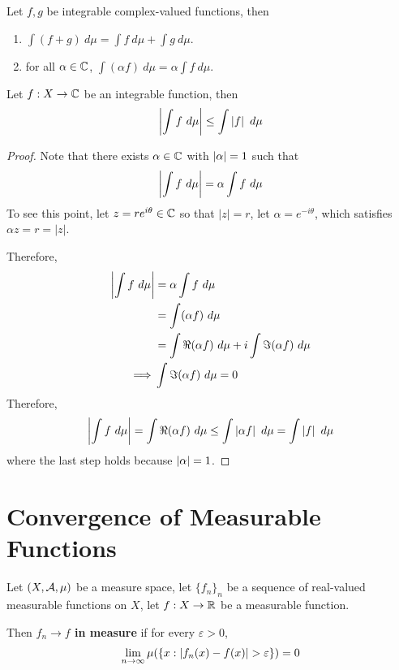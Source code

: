 \documentclass[11pt]{article}
\newcommand{\dmu}[0]{\ d\mu}
\begin{document}
	\begin{proposition}
		Let $f, g$ be integrable complex-valued functions, then
		\begin{enumerate}
			\item $\int (f+g)\dmu = \int f\dmu + \int g\dmu$.
			\item for all $\alpha \in \mathbb{C}$, $\int (\alpha f)\dmu = \alpha \int f\dmu$.
		\end{enumerate}
	\end{proposition}
	
	\begin{proposition}
		Let $f: X \to \mathbb{C}$ be an integrable function, then
		\begin{align}
			\abs{\int f\dmu} \leq \int \abs{f}\dmu
		\end{align}
		\begin{proof}
			Note that there exists $\alpha \in \mathbb{C}$ with $\left \vert {\alpha} \right \vert=1$ such that
			\begin{align}
				\abs{\int f\dmu} = \alpha \int f\dmu
			\end{align}
			To see this point, let $z = r e^{i \theta} \in \mathbb{C}$ so that $|z| = r$, let $\alpha = e^{-i\theta}$, which satisfies $\alpha z = r = |z|$.
			
			Therefore,
			\begin{align}
				\abs{\int f\dmu} &= \alpha \int f\dmu \\
				&= \int (\alpha f)\dmu \\
				&= \int \Re(\alpha f)\dmu + i \int \Im(\alpha f)\dmu \\
				\implies &\int \Im(\alpha f)\dmu = 0
			\end{align}
			Therefore,
			\begin{align}
				\abs{\int f\dmu} = \int \Re(\alpha f)\dmu \leq \int \abs{\alpha f}\dmu = \int \abs{f}\dmu
			\end{align}
			where the last step holds because $\left \vert {\alpha} \right \vert=1$.
		\end{proof}
	\end{proposition}
	
	\section{Convergence of Measurable Functions}
	\begin{definition}
		Let $(X, \mathcal{{A}}, \mu)$ be a measure space, let $\{f_n\}_n$ be a sequence of real-valued measurable functions on $X$, let $f: X \to \mathbb{R}$ be a measurable function.
		
		Then \textbf{$f_n \to f$ in measure} if for every $\varepsilon > 0$,
		\begin{align}
			\lim_{n\to\infty} \mu(\{x: \left \vert {f_n(x) - f(x)} \right \vert > \varepsilon \}) = 0
		\end{align}
	\end{definition}
	
\end{document}
